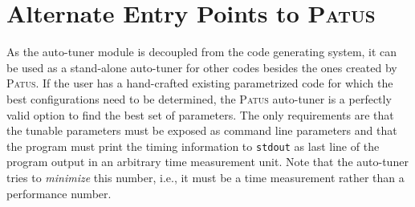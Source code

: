 \chapter{Alternate Entry Points to \textsc{Patus}}

As the auto-tuner module is decoupled from the code generating system, it can be used as a stand-alone auto-tuner
for other codes besides the ones created by \textsc{Patus}.
If the user has a hand-crafted existing parametrized code for which the best configurations need to be determined,
the \textsc{Patus} auto-tuner is a perfectly valid option to find the best set of parameters.
The only requirements are that the tunable parameters must be exposed as command line parameters
and that the program must print the timing information to \texttt{stdout} as last line of the program output in an arbitrary
time measurement unit.
Note that the auto-tuner tries to {\em minimize} this number, i.e., it must be a time measurement rather than a performance number.
